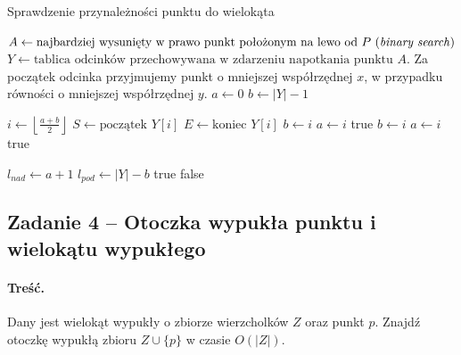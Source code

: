 \begin{algorithm}[H]
	\caption{Sprawdzenie przynależności punktu do wielokąta}
	\begin{algorithmic}[1]
			\State $A \gets \text{najbardziej wysunięty w prawo punkt położonym na lewo od $P$ (\textit{binary search})}$	
			\State $Y \gets \text{tablica odcinków przechowywana w zdarzeniu napotkania punktu $A$. }$Za początek odcinka przyjmujemy punkt o mniejszej współrzędnej $x$, w przypadku równości o mniejszej współrzędnej $y$.
			\State $a \gets 0$
			\State $b \gets |Y|-1$
			\State 
			
				\State $i \gets \left\lfloor \frac{a+b}{2} \right\rfloor$
				\State $S \gets \text{początek } Y[i]$ 
				\State $E \gets \text{koniec } Y[i]$ 
				 
					\State $b \gets i$
				 
					\State $a \gets i$
					 
						\State \Return true 
					 
						\State $b \gets i$
					 
						\State $a \gets i$
					\Else {}
						\State \Return true 
					\EndIf
				
				\EndIf    
			\EndWhile
			\State
			\State $l_{nad} \gets  a +1$
			\State $l_{pod} \gets |Y| - b$
				\State \Return true
			\EndIf
			\State
			\State \Return false
		\EndProcedure
	\end{algorithmic}
	\label{alg:Zadanie7_1}
\end{algorithm}

\subsection{Zadanie 4 -- Otoczka wypukła punktu i wielokątu wypukłego}
\paragraph{Treść.} Dany jest wielokąt wypukły o zbiorze wierzcholków $Z$ oraz punkt $p$. Znajdź otoczkę wypukłą zbioru $Z \cup \{p\}$ w czasie $O(|Z|)$.

